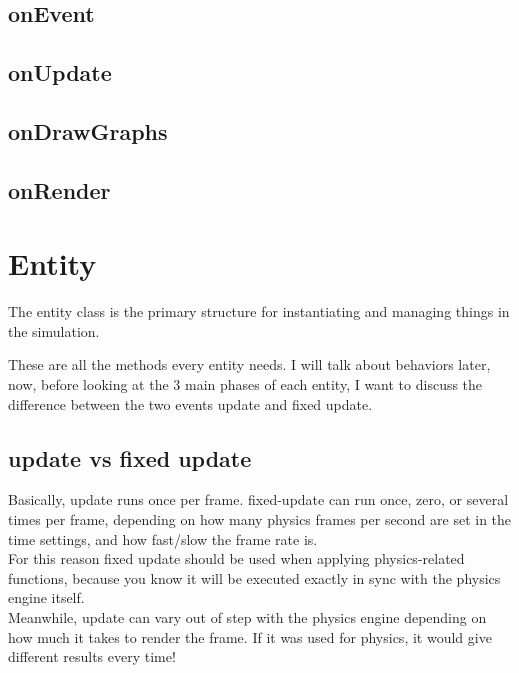 \documentclass{article}
\begin{document}
    \subsection{onEvent}\label{subsec:onevent}

    \subsection{onUpdate}\label{subsec:onupdate}

    \subsection{onDrawGraphs}\label{subsec:ondrawgraphs}

    \subsection{onRender}\label{subsec:onrender}

    \newpage

    \section{Entity}\label{sec:entity}

    The entity class is the primary structure for instantiating and managing things in the simulation.

    

    These are all the methods every entity needs.
    I will talk about behaviors later, now, before looking at the 3 main phases of each entity, I want to discuss the difference between the two events update and fixed update.

    \subsection{update vs fixed update}\label{subsec:update-vs-fixed-update}

    Basically, update runs once per frame.
    fixed-update can run once, zero, or several times per frame, depending on how many physics frames per second are set in the time settings, and how fast/slow the frame rate is.\\
    For this reason fixed update should be used when applying physics-related functions, because you know it will be executed exactly in sync with the physics engine itself.\\
    Meanwhile, update can vary out of step with the physics engine depending on how much it takes to render the frame.
    If it was used for physics, it would give different results every time!
\end{document}
